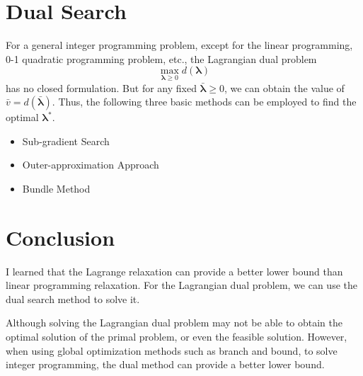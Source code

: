 \documentclass{article}
\begin{document}
\section{Dual Search} 

For a general integer programming problem, except for the linear programming, 0-1 quadratic programming problem, etc., the Lagrangian dual problem
\begin{equation}
	\max_{\bm{\lambda} \geq 0} d(\bm{\lambda})
\end{equation}
has no closed formulation. But for any fixed $\bar{\bm{\lambda}} \geq 0$, we can obtain the value of $\bar{v} = d(\bar{\bm{\lambda}})$. Thus, the following three basic methods can be employed to find the optimal $\bm{\lambda}^*$.

\begin{itemize}
	\item Sub-gradient Search
	\item Outer-approximation Approach
	\item Bundle Method
\end{itemize}

\section{Conclusion}

I learned that the Lagrange relaxation can provide a better lower bound than linear programming relaxation. For the Lagrangian dual problem, we can use the dual search method to solve it. 

Although solving the Lagrangian dual problem may not be able to obtain the optimal solution of the primal problem, or even the feasible solution. However, when using global optimization methods such as branch and bound, to solve integer programming, the dual method can provide a better lower bound.

% 
% 
\end{document}
